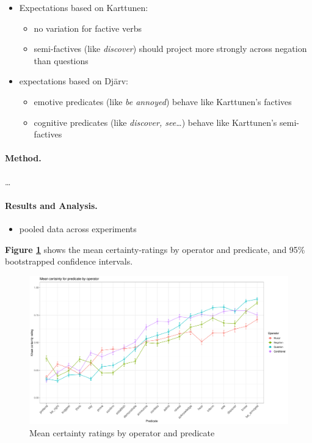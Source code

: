 \documentclass[12pt, a4paper]{scrartcl}
\begin{document}
	\begin{itemize}
		\item Expectations based on Karttunen:
		\begin{itemize}
			\item no variation for factive verbs
			\item semi-factives (like \emph{discover}) should project more strongly across negation than questions
		\end{itemize}

		\item expectations based on Djärv:
		\begin{itemize}
			\item emotive predicates (like \emph{be annoyed}) behave like Karttunen's factives
			\item cognitive predicates (like \emph{discover, see\dots}) behave like Karttunen's semi-factives
		\end{itemize}
	\end{itemize}


\paragraph{Method.} %
	\dots

\paragraph{Results and Analysis.} %
	\begin{itemize}
		\item pooled data across experiments
	\end{itemize}

	\textbf{Figure \ref{fig:figure1}} shows the mean certainty-ratings by operator and predicate, and 95\% bootstrapped confidence intervals.

	\begin{figure}[h]
		\centering
		\includegraphics[width=\textwidth]{graphs/proj-by-both.pdf}
		\caption{Mean certainty ratings by operator and predicate}
		\label{fig:figure1}
	\end{figure}
\end{document}
